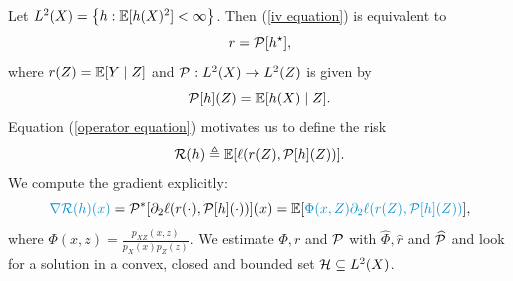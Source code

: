 \documentclass[
    a0paper,
    portrait,
    margin=3cm,
]{baposter}
\theoremstyle{fancy} %
\theoremstyle{regular}
\begin{document}
\begin{poster}
{    Let $ L^2 ( X ) = \left\{ h : \mathbb{E} [ h ( X )^2 ] < \infty \right\} $.
    Then (\ref{iv equation}) is equivalent to
    \begin{equation}
        \label{operator equation}
        r = \mathcal{P} [ h^{ \star } ]
    ,\end{equation}
    where $ r ( Z ) = \mathbb{E} [ Y \mid Z ] $ and $ \mathcal{P} : L^2 ( X ) \to L^2 ( Z ) $ is given by
    \begin{equation*}
        \mathcal{P} [ h ] ( Z ) = \mathbb{E} [ h ( X ) \mid Z ]
    .\end{equation*}
    Equation (\ref{operator equation}) motivates us to define the risk
    \begin{equation*}
        \mathcal{R} ( h ) \triangleq \mathbb{E} [ \ell ( r ( Z ), \mathcal{P} [ h ] ( Z ) ) ]
    .\end{equation*}
    We compute the gradient explicitly:
    \begin{equation*}
        {\color{fgv_light_blue}\nabla \risk ( h ) ( x )}
       = \meanop^{ * } [ \partial_{ 2 } \loss ( r ( \cdot ), \meanop [ h ] ( \cdot ) ) ] ( x )
       = \mean [ {\color{fgv_light_blue}\Phi ( x, Z ) \partial_{ 2 } \loss ( r ( Z ), \meanop [ h ] ( Z ) )} ]
    ,\end{equation*}
    where $ \Phi ( x, z ) = \frac{ p_{ XZ } ( x, z ) }{ p_{ X } ( x ) p_{ Z } ( z ) } $.
    We estimate $ \Phi, r $ and $ \mathcal{P} $ with $ \hat{ \Phi }, \hat{ r } $ and $ \widehat{ \mathcal{P} } $ and look for a solution in a convex, closed and bounded set $ \mathcal{H} \subseteq L^2 ( X ) $.
}



\end{poster}
\end{document}
